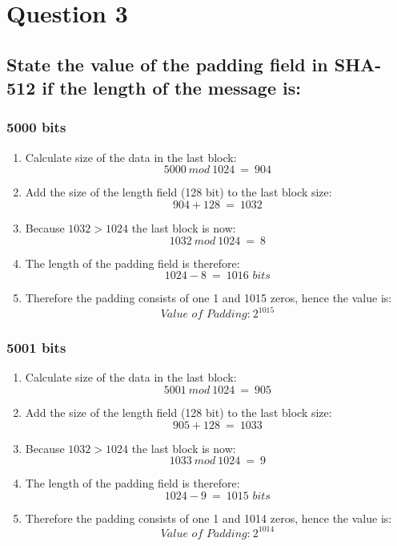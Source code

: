 \documentclass{report}
\begin{document}
	\section{Question 3}
	\startsection
		\renewcommand{\thesubsection}{\thesection.\Alph{subsection}}
		\subsection{State the value of the padding field in SHA-512 if the length of the message is:}
		\startsubsection
			\subsubsection{5000 bits}
			\startsubsection
				\begin{enumerate}
					\item Calculate size of the data in the last block:
					\[
						5000 \ mod \ 1024 \ = \ 904
					\]
					\item Add the size of the length field (128 bit) to the last block size:
					\[
						904 + 128 \ = \ 1032
					\]
					\item Because $1032 > 1024$ the last block is now:
					\[
						1032 \ mod \ 1024 \ = \ 8
					\]
					\item The length of the padding field is therefore:
					\[
						1024 - 8 \ = \ 1016 \textit{ bits}
					\]
					\item Therefore the padding consists of one 1 and 1015 zeros, hence the value is:
					\[
						\textit{Value of Padding:} \ 2^{1015}
					\]
				\end{enumerate}
			\closesection
			\subsubsection{5001 bits}
			\startsubsection
				\begin{enumerate}
					\item Calculate size of the data in the last block:
					\[
						5001 \ mod \ 1024 \ = \ 905
					\]
					\item Add the size of the length field (128 bit) to the last block size:
					\[
						905 + 128 \ = \ 1033
					\]
					\item Because $1032 > 1024$ the last block is now:
					\[
						1033 \ mod \ 1024 \ = \ 9
					\]
					\item The length of the padding field is therefore:
					\[
						1024 - 9 \ = \ 1015 \textit{ bits}
					\]
					\item Therefore the padding consists of one 1 and 1014 zeros, hence the value is:
					\[
						\textit{Value of Padding:} \ 2^{1014}
					\]
				\end{enumerate}
			\closesection
\end{document}
